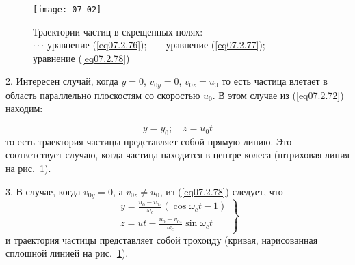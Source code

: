 \begin{figure}[h!]
	\center
	\texttt{[image: 07\_02]}
	\caption{Траектории частиц в скрещенных полях: \\
		\( \cdot \cdot \cdot \) уравнение (\ref{eq07.2.76}); -- -- уравнение
		(\ref{eq07.2.77}); --- уравнение (\ref{eq07.2.78})}
	\label{img07.2}
\end{figure}

2. Интересен случай, когда \( y = 0 \), \( v_{0y} = 0 \), \( v_{0z} = u_0 \) 
то есть частица влетает в область параллельно плоскостям со скоростью 
\( u_0 \). В этом случае из (\ref{eq07.2.72}) находим:

\begin{equation}
	y = y_0; \quad
	z = u_0 t
	\label{eq07.2.77}
\end{equation}
то есть траектория частицы представляет собой прямую линию. Это соответствует 
случаю, когда частица находится в центре колеса (штриховая линия 
на рис.~\ref{img07.2}).

3. В случае, когда \( v_{0y} = 0 \), а \( v_{0z} \neq u_0\), из 
(\ref{eq07.2.78}) следует, что
\begin{equation}
	\left. \begin{array}{c}
		y = \frac{u_0-v_{0z}}{\omega_c}(\cos\omega_c t - 1) \\
		z = ut - \frac{u_0-v_{0z}}{\omega_c}\sin\omega_c t
	\end{array} \right\}
	\label{eq07.2.78}
\end{equation}
и траектория частицы представляет собой трохоиду (кривая, нарисованная 
сплошной линией на рис.~\ref{img07.2}).
